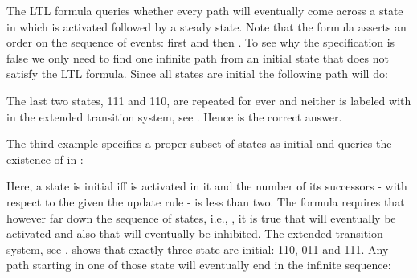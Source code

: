 \documentclass[letterpaper,10pt,english]{sphinxmanual}
\begin{document}
The LTL formula queries whether every path will eventually come across a state in which  is activated followed by a steady state.
Note that the formula asserts an order on the sequence of events: first  and then .
To see why the specification is false we only need to find one infinite path from an initial state that does not satisfy the LTL formula.
Since all states are initial the following path will do:

\begin{sphinxVerbatim}[commandchars=\\\{\}]
              
\end{sphinxVerbatim}

The last two states, 111 and 110, are repeated for ever and neither is labeled with  in the extended transition system,
see {\hyperref[\detokenize{Manual:figure18}]{}}.
Hence  is the correct answer.

The third example specifies a proper subset of states as initial and queries the existence of  in :

\begin{sphinxVerbatim}[commandchars=\\\{\}]
  
  
     
\end{sphinxVerbatim}

Here, a state is initial iff  is activated in it and the number of its successors - with respect to the given the update rule - is less than two.
The formula  requires that however far down the sequence of states, i.e., ,
it is true that  will eventually be activated and also that  will eventually be inhibited.
The extended transition system, see {\hyperref[\detokenize{Manual:figure18}]{}}, shows that exactly three state are initial: 110, 011 and 111.
Any path starting in one of those state will eventually end in the infinite sequence:
\end{document}
